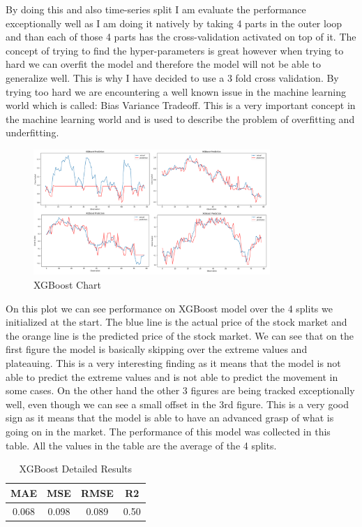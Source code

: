 \documentclass{imc-inf}
\begin{document}
	By doing this and also time-series split I am evaluate the performance exceptionally well as I am doing it natively by taking 4 parts in the outer loop and than each of those 4 parts has the cross-validation activated on top of it.
	The concept of trying to find the hyper-parameters is great however when trying to hard we can overfit the model and therefore the model will not be able to generalize well. This is why I have decided to use a 3 fold cross validation.
	By trying too hard we are encountering a well known issue in the machine learning world which is called: Bias Variance Tradeoff. This is a very important concept in the machine learning world and is used to describe the problem of overfitting
	and underfitting. 
	\begin{figure}[h]
		\centering
		\includegraphics[width=0.8\textwidth]{xgboost_chart.png}
		\caption{XGBoost Chart}
		\label{fig:xgboost_chart}
	\end{figure}
	On this plot we can see performance on XGBoost model over the 4 splits we initialized at the start. The blue line is the actual price of the stock market and the orange line is the predicted price of the stock market.
	We can see that on the first figure the model is basically skipping over the extreme values and plateauing. This is a very interesting finding as it means that the model is not able to predict the extreme values and is not able to predict the 
	movement in some cases. On the other hand the other 3 figures are being tracked exceptionally well, even though we can see a small offset in the 3rd figure. This is a very good sign as it means that the model is able to have an 
	advanced grasp of what is going on in the market. The performance of this model was collected in this table. All the values in the table are the average of the 4 splits.
	\begin{table}[h]
		\centering
		\begin{tabular}{|c|c|c|c|}
			\hline
			\textbf{MAE} & \textbf{MSE} & \textbf{RMSE} & \textbf{R2} \\ \hline
			0.068 & 0.098 & 0.089 & 0.50 \\ \hline
		\end{tabular}
		\caption{XGBoost Detailed Results}
		\label{tab:xgboost_detailed_results}
	\end{table}
\end{document}
